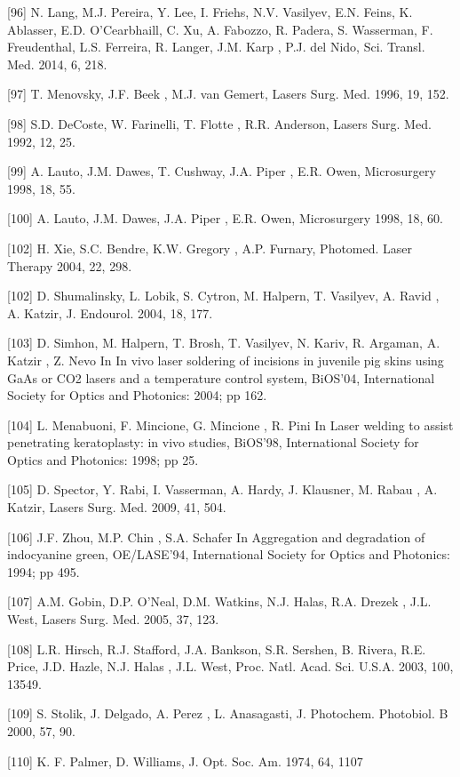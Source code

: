 [96]	N. Lang, M.J. Pereira, Y. Lee, I. Friehs, N.V. Vasilyev, E.N. Feins, K. Ablasser, E.D. O'Cearbhaill, C. Xu, A. Fabozzo, R. Padera, S. Wasserman, 
F. Freudenthal, L.S. Ferreira, R. Langer, J.M. Karp , P.J. del Nido, Sci. Transl. Med. 2014, 6, 218.

[97]	T. Menovsky, J.F. Beek , M.J. van Gemert, Lasers Surg. Med. 1996, 19, 152.

[98]	S.D. DeCoste, W. Farinelli, T. Flotte , R.R. Anderson, Lasers Surg. Med. 1992, 12, 25.

[99]	A. Lauto, J.M. Dawes, T. Cushway, J.A. Piper , E.R. Owen, Microsurgery 1998, 18, 55.

[100]	A. Lauto, J.M. Dawes, J.A. Piper , E.R. Owen, Microsurgery 1998, 18, 60.

[102]	H. Xie, S.C. Bendre, K.W. Gregory , A.P. Furnary, Photomed. Laser Therapy 2004, 22, 298.

[102]	D. Shumalinsky, L. Lobik, S. Cytron, M. Halpern, T. Vasilyev, A. Ravid , A. Katzir, J. Endourol. 2004, 18, 177.

[103]	D. Simhon, M. Halpern, T. Brosh, T. Vasilyev, N. Kariv, R. Argaman, A. Katzir , Z. Nevo In In vivo laser soldering of incisions in juvenile pig 
skins using GaAs or CO2 lasers and a temperature control system, BiOS'04, International Society for Optics and Photonics: 2004; pp 162.

[104]	L. Menabuoni, F. Mincione, G. Mincione , R. Pini In Laser welding to assist penetrating keratoplasty: in vivo studies, BiOS'98, International 
Society for Optics and Photonics: 1998; pp 25.

[105]	D. Spector, Y. Rabi, I. Vasserman, A. Hardy, J. Klausner, M. Rabau , A. Katzir, Lasers Surg. Med. 2009, 41, 504.

[106]	J.F. Zhou, M.P. Chin , S.A. Schafer In Aggregation and degradation of indocyanine green, OE/LASE'94, International Society for Optics and 
Photonics: 1994; pp 495.

[107]	A.M. Gobin, D.P. O'Neal, D.M. Watkins, N.J. Halas, R.A. Drezek , J.L. West, Lasers Surg. Med. 2005, 37, 123.

[108]	L.R. Hirsch, R.J. Stafford, J.A. Bankson, S.R. Sershen, B. Rivera, R.E. Price, J.D. Hazle, N.J. Halas , J.L. West, Proc. Natl. Acad. Sci. U.S.A. 
2003, 100, 13549.

[109]	S. Stolik, J. Delgado, A. Perez , L. Anasagasti, J. Photochem. Photobiol. B 2000, 57, 90.

[110]	K. F. Palmer, D. Williams, J. Opt. Soc. Am. 1974, 64, 1107

